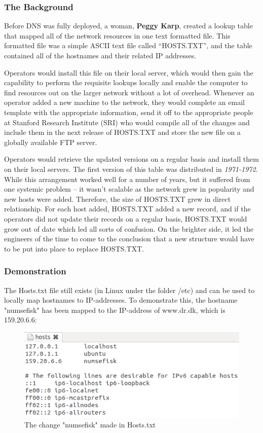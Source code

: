 \subsubsection{The Background} 
Before DNS was fully deployed, a woman, \textbf{Peggy Karp}, created a lookup table that mapped all of the network resources in one text formatted file. This formatted file was a simple ASCII text file called “HOSTS.TXT”, and the table contained all of the hostnames and their related IP addresses. 

Operators would install this file on their local server, which would then gain the capability to perform the requisite lookups locally and enable the computer to find resources out on the larger network without a lot of overhead. Whenever an operator added a new machine to the network, they would complete an email template with the appropriate information, send it off to the appropriate people at Stanford Research Institute (SRI) who would compile all of the changes and include them in the next release of HOSTS.TXT and store the new file on a globally available FTP server. 

Operators would retrieve the updated versions on a regular basis and install them on their local servers. The first version of this table was distributed in \textit{1971-1972}. While this arrangement worked well for a number of years, but it suffered from one systemic problem – it wasn’t scalable as the network grew in popularity and new hosts were added. Therefore, the size of HOSTS.TXT grew in direct relationship. For each host added, HOSTS.TXT added a new record, and if the operators did not update their records on a regular basis, HOSTS.TXT would grow out of date which led all sorts of confusion. On the brighter side, it led the engineers of the time to come to the conclusion that a new structure would have to be put into place to replace HOSTS.TXT.

\subsubsection{Demonstration}
The Hosts.txt file still exists (in Linux under the folder /etc) and can be used to locally map hostnames to IP-addresses. To demonstrate this, the hostname "numsefisk" has been mapped to the IP-address of www.dr.dk, which is 159.20.6.6:

\begin{figure}[ht!]
\centering
\includegraphics[width=150mm]{img/hostsText.png}
\caption{The change "numsefisk" made in Hosts.txt}
\label{hostsText}
\end{figure}

